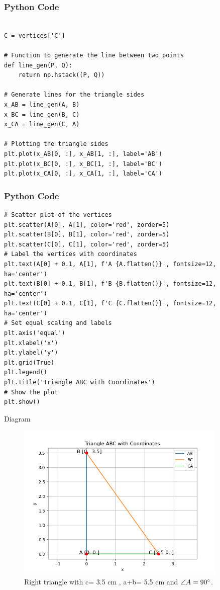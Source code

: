\documentclass{beamer}
\begin{document}
\begin{frame}[fragile]
\frametitle{Python Code}
\begin{verbatim}

C = vertices['C']

# Function to generate the line between two points
def line_gen(P, Q):
    return np.hstack((P, Q))

# Generate lines for the triangle sides
x_AB = line_gen(A, B)
x_BC = line_gen(B, C)
x_CA = line_gen(C, A)

# Plotting the triangle sides
plt.plot(x_AB[0, :], x_AB[1, :], label='AB')
plt.plot(x_BC[0, :], x_BC[1, :], label='BC')
plt.plot(x_CA[0, :], x_CA[1, :], label='CA')

\end{verbatim}
\end{frame}
\begin{frame}[fragile]
\frametitle{Python Code}
\begin{verbatim}
# Scatter plot of the vertices
plt.scatter(A[0], A[1], color='red', zorder=5)
plt.scatter(B[0], B[1], color='red', zorder=5)
plt.scatter(C[0], C[1], color='red', zorder=5)
# Label the vertices with coordinates
plt.text(A[0] + 0.1, A[1], f'A {A.flatten()}', fontsize=12, ha='center')
plt.text(B[0] + 0.1, B[1], f'B {B.flatten()}', fontsize=12, ha='center')
plt.text(C[0] + 0.1, C[1], f'C {C.flatten()}', fontsize=12, ha='center')
# Set equal scaling and labels
plt.axis('equal')
plt.xlabel('x')
plt.ylabel('y')
plt.grid(True)
plt.legend()
plt.title('Triangle ABC with Coordinates')
# Show the plot
plt.show()

\end{verbatim}
\end{frame}
\begin{frame}{Diagram}
    \begin{figure}[h!]
        \centering
        \includegraphics[width=0.9\textwidth]{fig.png} %
        \caption{Right triangle with  c= 3.5 cm , a+b= 5.5 cm and $\angle{A}=90\degree$.}
    \end{figure}
\end{frame}
\end{document}
